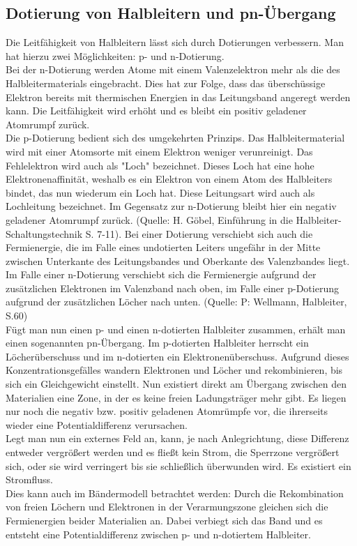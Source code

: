 

\subsection{Dotierung von Halbleitern und pn-Übergang}
Die Leitfähigkeit von Halbleitern lässt sich durch Dotierungen verbessern. Man hat hierzu zwei Möglichkeiten: p- und n-Dotierung. \\
Bei der n-Dotierung werden Atome mit einem Valenzelektron mehr als die des Halbleitermaterials eingebracht. Dies hat zur Folge, dass das überschüssige Elektron bereits mit thermischen Energien in das Leitungsband angeregt werden kann. Die Leitfähigkeit wird erhöht und es bleibt ein positiv geladener Atomrumpf zurück.\\
Die p-Dotierung bedient sich des umgekehrten Prinzips. Das Halbleitermaterial wird mit einer Atomsorte mit einem Elektron weniger verunreinigt. Das Fehlelektron wird auch als "Loch" bezeichnet. Dieses Loch hat eine hohe Elektronenaffinität, weshalb es ein Elektron von einem Atom des Halbleiters bindet, das nun wiederum ein Loch hat. Diese Leitungsart wird auch als Lochleitung bezeichnet. Im Gegensatz zur n-Dotierung bleibt hier ein negativ geladener Atomrumpf zurück. (Quelle: H. Göbel, Einführung in die Halbleiter-Schaltungstechnik S. 7-11). Bei einer Dotierung verschiebt sich auch die Fermienergie, die im Falle eines undotierten Leiters ungefähr in der Mitte zwischen Unterkante des Leitungsbandes und Oberkante des Valenzbandes liegt. Im Falle einer n-Dotierung verschiebt sich die Fermienergie aufgrund der zusätzlichen Elektronen im Valenzband nach oben, im Falle einer p-Dotierung aufgrund der zusätzlichen Löcher nach unten. (Quelle: P: Wellmann, Halbleiter, S.60)\\
Fügt man nun einen p- und einen n-dotierten Halbleiter zusammen, erhält man einen sogenannten pn-Übergang. Im p-dotierten Halbleiter herrscht ein Löcherüberschuss und im n-dotierten ein Elektronenüberschuss. Aufgrund dieses Konzentrationsgefälles wandern Elektronen und Löcher und rekombinieren, bis sich ein Gleichgewicht einstellt. Nun existiert direkt am Übergang zwischen den Materialien eine Zone, in der es keine freien Ladungsträger mehr gibt. Es liegen nur noch die negativ bzw. positiv geladenen Atomrümpfe vor, die ihrerseits wieder eine Potentialdifferenz verursachen.\\
Legt man nun ein externes Feld an, kann, je nach Anlegrichtung, diese Differenz entweder vergrößert werden und es fließt kein Strom, die Sperrzone vergrößert sich, oder sie wird verringert bis sie schließlich überwunden wird. Es existiert ein Stromfluss. \\
Dies kann auch im Bändermodell betrachtet werden: Durch die Rekombination von freien Löchern und Elektronen in der Verarmungszone gleichen sich die Fermienergien beider Materialien an. Dabei verbiegt sich das Band und es entsteht eine Potentialdifferenz zwischen p- und n-dotiertem Halbleiter. \\

